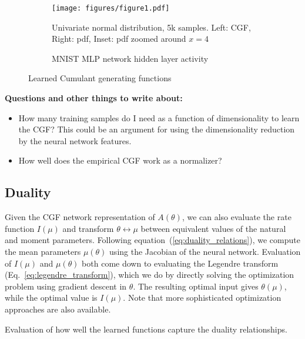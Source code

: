 \documentclass[11pt]{article}      %
\begin{document}
\begin{figure}[tb]
  \centering
  \begin{subfigure}[t]{\textwidth}
    \centering
    \texttt{[image: figures/figure1.pdf]}
    \caption{Univariate normal distribution, 5k samples. Left: CGF, Right: pdf, Inset: pdf zoomed around $x=4$}
    \label{fig:1a_CGF_Normal}
  \end{subfigure}
  \begin{subfigure}[t]{\textwidth}
    \centering
    \caption{MNIST MLP network hidden layer activity}
    \label{fig:1b_CGF_MNIST}
  \end{subfigure}

  \caption{Learned Cumulant generating functions}
  \label{fig:1_CGF}
\end{figure}

\noindent \textbf{Questions and other things to write about:}
\begin{itemize}
  \item How many training samples do I need as a function of dimensionality to learn the CGF? This could be an argument for using the dimensionality reduction by the neural network features.
  \item How well does the empirical CGF work as a normalizer?
\end{itemize}



\subsection{Duality}

Given the CGF network representation of $A(\theta)$, we can also evaluate the rate function $I(\mu)$ and transform $\theta \leftrightarrow \mu$ between equivalent values of the natural and moment parameters.
Following equation~(\ref{eq:duality_relations}), we compute the mean parameters $\mu(\theta)$ using the Jacobian of the neural network. 
Evaluation of $I(\mu)$ and $\mu(\theta)$ both come down to evaluating the Legendre transform (Eq.~\ref{eq:legendre_transform}), which we do by directly solving the optimization problem using gradient descent in $\theta$.
The resulting optimal input gives $\theta(\mu)$, while the optimal value is $I(\mu)$.
Note that more sophisticated optimization approaches are also available.


Evaluation of how well the learned functions capture the duality relationships.
\end{document}
